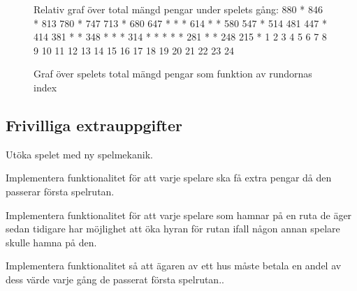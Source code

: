 \begin{figure}[H]
\centering

\begin{REPL}
Relativ graf över total mängd pengar under spelets gång:
880  *                                                                         
846     *                                                                      
813                                                                            
780        *                                                                   
747                                                                            
713           *                                                                
680                                                                            
647              *  *  *                                                       
614                       *  *                                                 
580                                                                            
547                             *                                              
514                                                                            
481                                                                            
447                                *                                           
414                                                                            
381                                   *  *                                     
348                                         *  *  *                            
314                                                  *  *  *  *  *             
281                                                                 *  *       
248                                                                            
215                                                                       *    
     1  2  3  4  5  6  7  8  9  10 11 12 13 14 15 16 17 18 19 20 21 22 23 24 
\end{REPL}
\caption {Graf över spelets total mängd pengar som funktion av rundornas index}
\label{fig:scalajava:lthopoly-team:statistics}
\end{figure}

\subsection{Frivilliga extrauppgifter}

\Task Utöka spelet med ny spelmekanik.

\Subtask Implementera funktionalitet för att varje spelare ska få extra pengar då den passerar första spelrutan.

\Subtask Implementera funktionalitet för att varje spelare som hamnar på en ruta de äger sedan tidigare har möjlighet att öka hyran för rutan ifall någon annan spelare skulle hamna på den.

\Subtask Implementera funktionalitet så att ägaren av ett hus måste betala en andel av dess värde varje gång de passerat första spelrutan.. 
    
